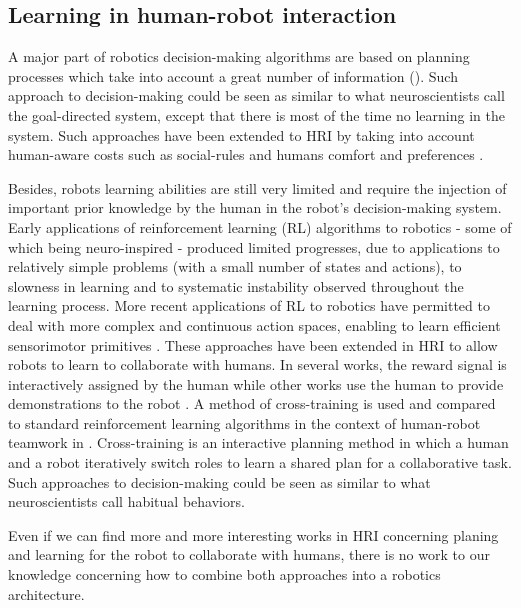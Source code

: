 \documentclass[english,a4paper,11pt,twoside]{StyleThese}
\begin{document}
\subsection{Learning in human-robot interaction}

A major part of robotics decision-making algorithms are based on planning processes which take into account a great number of information (\cite{ingrand2014deliberation}). Such approach to decision-making could be seen as similar to what neuroscientists call the goal-directed system, except that there is most of the time no learning in the system. Such approaches have been extended to HRI by taking into account human-aware costs such as social-rules and humans comfort and preferences \cite{cirillo2010human,Lallement2014hatp}.

Besides, robots learning abilities are still very limited and require the injection of important prior knowledge by the human in the robot’s decision-making system. Early applications of reinforcement learning (RL) algorithms to robotics \cite{hayes1994robot, morimoto2001acquisition, smart2002effective} - some of which being neuro-inspired - produced limited progresses, due to applications to relatively simple problems (with a small number of states and actions), to slowness in learning and to systematic instability observed throughout the learning process. More recent applications of RL to robotics have permitted to deal with more complex and continuous action spaces, enabling to learn efficient sensorimotor primitives \cite{kober2011learning, martins2010learning, stulp2013robot}. These approaches have been extended in HRI to allow robots to learn to collaborate with humans.
In several works, the reward signal is interactively assigned by the human \cite{kaplan2002robotic, knox2012reinforcement} while other works use the human to provide demonstrations to the robot \cite{nicolescu2003natural, thomaz2006reinforcement}.
A method of cross-training is used and compared to standard reinforcement learning algorithms in the context of human-robot teamwork in \cite{nikolaidis2013human}. Cross-training is an interactive planning method in which a human and a robot iteratively switch roles to learn a shared plan for a collaborative task. Such approaches to decision-making could be seen as similar to what neuroscientists call habitual behaviors.

Even if we can find more and more interesting works in HRI concerning planing and learning for the robot to collaborate with humans, there is no work to our knowledge concerning how to combine both approaches into a robotics architecture.
\end{document}
